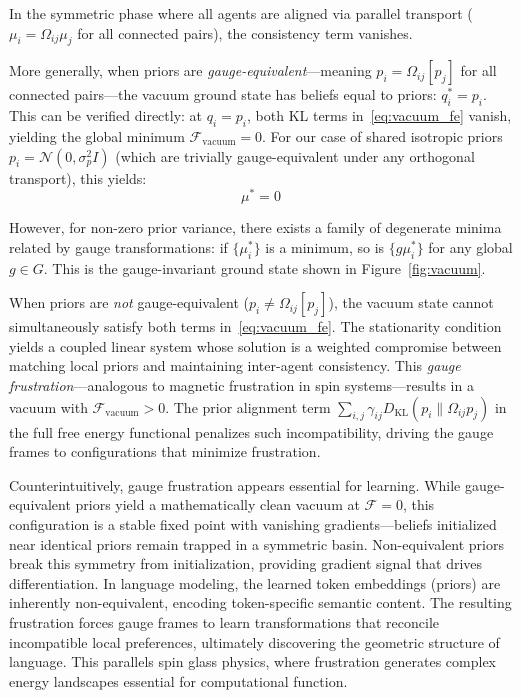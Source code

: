 \documentclass[twoside,11pt]{article}
\begin{document}
In the symmetric phase where all agents are aligned via parallel transport ($\mu_i = \Omega_{ij}\mu_j$ for all connected pairs), the consistency term vanishes.

More generally, when priors are \emph{gauge-equivalent}---meaning $p_i = \Omega_{ij}[p_j]$ for all connected pairs---the vacuum ground state has beliefs equal to priors: $q_i^* = p_i$. This can be verified directly: at $q_i = p_i$, both KL terms in~\eqref{eq:vacuum_fe} vanish, yielding the global minimum $\mathcal{F}_{\text{vacuum}} = 0$. For our case of shared isotropic priors $p_i = \mathcal{N}(0, \sigma_p^2 I)$ (which are trivially gauge-equivalent under any orthogonal transport), this yields:
\begin{equation}
\mu^* = 0
\end{equation}

However, for non-zero prior variance, there exists a family of degenerate minima related by gauge transformations: if $\{\mu_i^*\}$ is a minimum, so is $\{g \mu_i^*\}$ for any global $g \in G$. This is the gauge-invariant ground state shown in Figure~\ref{fig:vacuum}.

When priors are \emph{not} gauge-equivalent ($p_i \neq \Omega_{ij}[p_j]$), the vacuum state cannot simultaneously satisfy both terms in~\eqref{eq:vacuum_fe}. The stationarity condition yields a coupled linear system whose solution is a weighted compromise between matching local priors and maintaining inter-agent consistency. This \emph{gauge frustration}---analogous to magnetic frustration in spin systems---results in a vacuum with $\mathcal{F}_{\text{vacuum}} > 0$. The prior alignment term $\sum_{i,j} \gamma_{ij} D_{\mathrm{KL}}(p_i \| \Omega_{ij} p_j)$ in the full free energy functional penalizes such incompatibility, driving the gauge frames to configurations that minimize frustration.

Counterintuitively, gauge frustration appears essential for learning. While gauge-equivalent priors yield a mathematically clean vacuum at $\mathcal{F} = 0$, this configuration is a stable fixed point with vanishing gradients---beliefs initialized near identical priors remain trapped in a symmetric basin. Non-equivalent priors break this symmetry from initialization, providing gradient signal that drives differentiation. In language modeling, the learned token embeddings (priors) are inherently non-equivalent, encoding token-specific semantic content. The resulting frustration forces gauge frames to learn transformations that reconcile incompatible local preferences, ultimately discovering the geometric structure of language. This parallels spin glass physics, where frustration generates complex energy landscapes essential for computational function.
\end{document}
